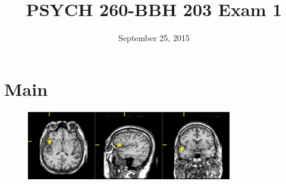 \documentclass[answers]{exam}
\title{PSYCH 260-BBH 203 Exam 1}
\author{}
\date{September 25, 2015}
\begin{document}
\maketitle

\begin{center}
\end{center}
\vspace{0.1in}

\newpage

\section{Main}

\begin{figure}[h]
\includegraphics[width=0.80\textwidth]{img/three-brains.jpg}
\centering
\end{figure}
\end{document}
